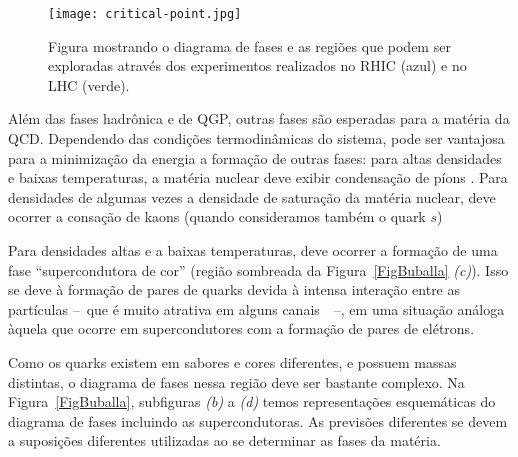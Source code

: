 \begin{figure}[!htb]
	\centering
	\texttt{[image: critical-point.jpg]}
	\caption{Figura mostrando o diagrama de fases e as regiões que podem ser exploradas através dos experimentos realizados no RHIC (azul) e no LHC (verde).\label{FigRHIC}}
\end{figure}


Além das fases hadrônica e de QGP, outras fases são esperadas para a matéria da QCD. Dependendo das condições termodinâmicas do sistema, pode ser vantajosa para a minimização da energia a formação de outras fases: para altas densidades e baixas temperaturas, a matéria nuclear deve exibir condensação de píons \cite{Glendenning,Schaefer}. Para densidades de algumas vezes a densidade de saturação da matéria nuclear, deve ocorrer a consação de kaons (quando consideramos também o quark $s$)

Para densidades altas e a baixas temperaturas, deve ocorrer a formação de uma fase ``supercondutora de cor'' (região sombreada da Figura~\ref{FigBuballa} \emph{(c)}). Isso se deve à formação de pares de quarks devida à intensa interação entre as partículas --~que é muito atrativa em alguns canais~\cite{Weber}~--, em uma situação análoga àquela que ocorre em supercondutores com a formação de pares de elétrons.

Como os quarks existem em sabores e cores diferentes, e possuem massas distintas, o diagrama de fases nessa região deve ser bastante complexo. Na Figura~\ref{FigBuballa}, subfiguras \emph{(b)} a \emph{(d)} temos representações esquemáticas do diagrama de fases incluindo as supercondutoras. As previsões diferentes se devem a suposições diferentes utilizadas ao se determinar as fases da matéria.


